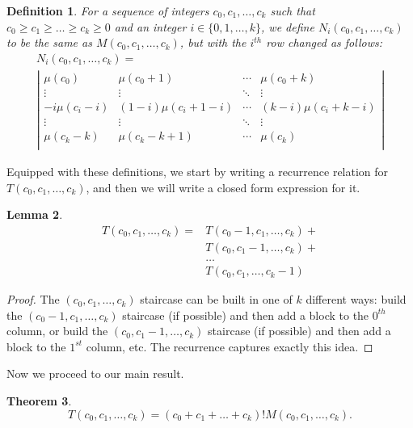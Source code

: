 \documentclass[12pt]{amsart}
\newtheorem{theorem}{Theorem}[section]
\newtheorem{definition}[theorem]{Definition}
\newtheorem{lemma}[theorem]{Lemma}
\newcommand{\ifact}{\mu}
\newcommand{\M}{M}
\newcommand{\N}{N}
\begin{document}
\begin{definition}
For a sequence of integers $c_0, c_1, \dots, c_k$ such that $c_0 \geq c_1 \geq \dots \geq c_k \geq 0$ and an integer $i \in \{0,1,\dots,k\}$, we define $\N_i(c_0,c_1,\dots,c_k)$ to be the same as $\M(c_0, c_1, \dots, c_k)$, but with the $i^{th}$ row changed as follows:
\begin{multline*}
\N_i(c_0, c_1, \dots, c_k) = \\
\left|
\begin{matrix}
\ifact(c_0) & \ifact(c_0+1) & \cdots & \ifact(c_0+k) \\
\vdots & \vdots & \ddots & \vdots \\
-i\ifact(c_i-i) & (1-i)\ifact(c_i + 1 - i) & \cdots & (k-i) \ifact(c_i+k-i) \\
\vdots & \vdots & \ddots & \vdots \\
\ifact(c_k-k) & \ifact(c_k-k+1) & \cdots & \ifact(c_k) \\
\end{matrix} \right|
\end{multline*}
\end{definition}

\vspace{0.75cm}

Equipped with these definitions, we start by writing a recurrence relation for $T(c_0, c_1, \dots, c_k)$, and then we will write a closed form expression for it.
\begin{lemma}
\begin{align*}
T(c_0, c_1, \dots, c_k) = & T(c_0-1, c_1, \dots, c_k) + \\
&  T(c_0, c_1-1, \dots, c_k) + \\
& \dots \\
& T(c_0, c_1, \dots, c_k-1)
\end{align*}
\label{lem:recurrence}
\end{lemma}

\begin{proof}
The $(c_0, c_1, \dots, c_k)$ staircase can be built in one of $k$ different ways: build the $(c_0-1, c_1, \dots, c_k)$ staircase (if possible) and then add a block to the $0^{th}$ column, or build the $(c_0, c_1-1, \dots, c_k)$ staircase (if possible) and then add a block to the $1^{st}$ column, etc. The recurrence captures exactly this idea. 
\end{proof}

Now we proceed to our main result.

\begin{theorem}
$$
T(c_0, c_1, \dots, c_k) = (c_0 + c_1 + \dots + c_k)! \M(c_0, c_1, \dots, c_k).
$$
\label{thm:closedform}
\end{theorem}
\end{document}
